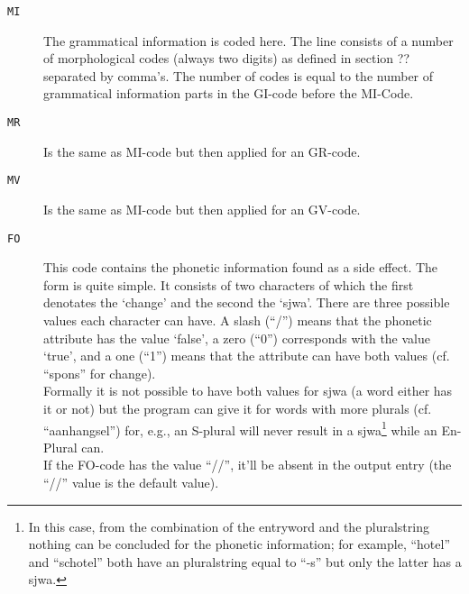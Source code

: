 \begin{description}
  \item [\verb+MI+] \hspace{3mm}
                    The grammatical information is coded here. The line consists
                    of a number of morphological codes (always two digits) as 
                    defined in section ?? separated by comma's. The number of
                    codes is equal to the number of grammatical information 
                    parts in the GI-code before the MI-Code. 
  \item [\verb+MR+] \hspace{3mm}
                    Is the same as MI-code but then applied for an GR-code.
  \item [\verb+MV+] \hspace{3mm}
                    Is the same as MI-code but then applied for an GV-code.
  \item [\verb+FO+] \hspace{3mm}
                    This code contains the phonetic information found as a side
                    effect. The form is quite simple. It consists of two 
                    characters of which the first denotates the `change' and 
                    the second the `sjwa'. There are three possible values each
                    character can have. A slash (``/'') means that the phonetic 
                    attribute has the value `false', a zero (``0'') corresponds
                    with the value `true', and a one (``1'') means that the 
                    attribute can have both values (cf. ``spons'' for change).
                    \\ Formally it is not possible to have both values for 
                    sjwa (a word either has it or not) but the program can 
                    give it for words with more plurals (cf. ``aanhangsel'')
                    for, e.g., an S-plural will never result in a sjwa\footnote{
                    In this case, from the combination of the entryword and the pluralstring 
                    nothing can be concluded for the phonetic information; for 
                    example, ``hotel'' and ``schotel'' both have an 
                   pluralstring equal to ``-s'' but only the latter has a sjwa.}
                    while an En-Plural can.
                    \\ If the FO-code has the value ``//'', it'll be absent in 
                    the output entry (the ``//'' value is the default value).
\end{description}

